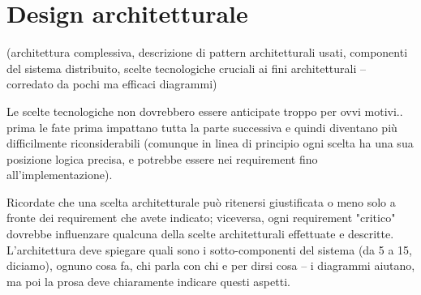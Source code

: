\section{Design architetturale}

(architettura complessiva, descrizione di pattern architetturali usati, componenti del sistema distribuito, scelte tecnologiche cruciali ai fini architetturali -- corredato da pochi ma efficaci diagrammi)

Le scelte tecnologiche non dovrebbero essere anticipate troppo per ovvi motivi.. prima le fate prima impattano tutta la parte successiva e quindi diventano più difficilmente riconsiderabili (comunque in linea di principio ogni scelta ha una sua posizione logica precisa, e potrebbe essere nei requirement fino all'implementazione).

Ricordate che una scelta architetturale può ritenersi giustificata o meno solo a fronte dei requirement che avete indicato; viceversa, ogni requirement "critico" dovrebbe influenzare qualcuna della scelte architetturali effettuate e descritte.
L'architettura deve spiegare quali sono i sotto-componenti del sistema (da 5 a 15, diciamo), ognuno cosa fa, chi parla con chi e per dirsi cosa -- i diagrammi aiutano, ma poi la prosa deve chiaramente indicare questi aspetti.
